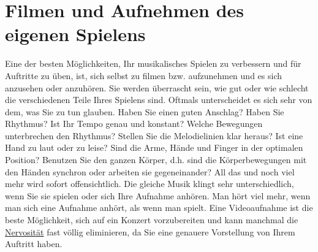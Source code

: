 
\section{Filmen und Aufnehmen des eigenen Spielens}\hypertarget{c1iii13}{} 


Eine der besten Möglichkeiten, Ihr musikalisches Spielen zu verbessern und für Auftritte zu üben, ist, sich selbst zu filmen bzw. aufzunehmen und es sich anzusehen oder anzuhören.
Sie werden überrascht sein, wie gut oder wie schlecht die verschiedenen Teile Ihres Spielens sind.
Oftmals unterscheidet es sich sehr von dem, was Sie zu tun glauben.
Haben Sie einen guten Anschlag?
Haben Sie Rhythmus?
Ist Ihr Tempo genau und konstant?
Welche Bewegungen unterbrechen den Rhythmus?
Stellen Sie die Melodielinien klar heraus?
Ist eine Hand zu laut oder zu leise?
Sind die Arme, Hände und Finger in der optimalen Position?
Benutzen Sie den ganzen Körper, d.h. sind die Körperbewegungen mit den Händen synchron oder arbeiten sie gegeneinander?
All das und noch viel mehr wird sofort offensichtlich.
Die gleiche Musik klingt sehr unterschiedlich, wenn Sie sie spielen oder sich Ihre Aufnahme anhören.
Man hört viel mehr, wenn man sich eine Aufnahme anhört, als wenn man spielt.
Eine Videoaufnahme ist die beste Möglichkeit, sich auf ein Konzert vorzubereiten und kann manchmal die \hyperlink{c1iii15}{Nervosität} fast völlig eliminieren, da Sie eine genauere Vorstellung von Ihrem Auftritt haben.

